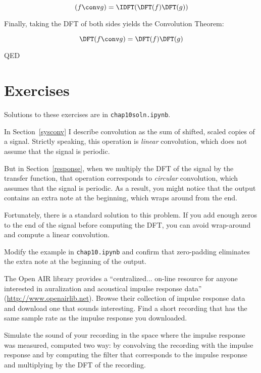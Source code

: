 \documentclass[12pt]{book} \usepackage[width=5.5in,height=8.5in, hmarginratio=3:2,vmarginratio=1:1]{geometry}
\begin{document}
%
\[ (f \conv g) = \IDFT( \DFT(f) \DFT(g) ) \] 

%
Finally, taking the DFT of both sides yields the Convolution Theorem: 

%
\[ \DFT(f \conv g) = \DFT(f) \DFT(g) \] 

%
QED 

\section{Exercises} 

Solutions to these exercises are in {\tt chap10soln.ipynb}. 

\begin{exercise} In Section~\ref{sysconv} I describe convolution as the sum of shifted, scaled copies of a signal. Strictly speaking, this operation is {\em linear} convolution, which does not assume that the signal is periodic. 

But in Section~\ref{response}, when we multiply the DFT of the signal by the transfer function, that operation corresponds to {\em circular} convolution, which assumes that the signal is periodic. As a result, you might notice that the output contains an extra note at the beginning, which wraps around from the end. 

Fortunately, there is a standard solution to this problem. If you add enough zeros to the end of the signal before computing the DFT, you can avoid wrap-around and compute a linear convolution. 

Modify the example in {\tt chap10.ipynb} and confirm that zero-padding eliminates the extra note at the beginning of the output. \end{exercise} 

\begin{exercise} The Open AIR library provides a ``centralized... on-line resource for anyone interested in auralization and acoustical impulse response data'' (\url{http://www.openairlib.net}). Browse their collection of impulse response data and download one that sounds interesting. Find a short recording that has the same sample rate as the impulse response you downloaded. 

Simulate the sound of your recording in the space where the impulse response was measured, computed two way: by convolving the recording with the impulse response and by computing the filter that corresponds to the impulse response and multiplying by the DFT of the recording. \end{exercise} 
\end{document}
